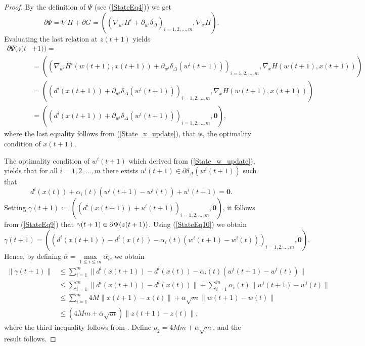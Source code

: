 \documentclass[12pt]{article}
\numberwithin{equation}{section}
\begin{document}
\begin{proof}
By the definition of $\Psi$ (see (\ref{StateEq4})) we get
\begin{equation*}
	\partial \Psi = \nabla H + \partial G  
= \left( \left( \nabla_{w^i} H^i + \partial_{w^i} \delta_{\Delta} \right)_{i=1,2, \ldots ,m} , \nabla_x H \right) .
\end{equation*}
Evaluating the last relation at $z(t+1)$ yields
\begin{align}
	\partial \Psi(z(t & + 1)) = \\
	& = \left( \left( \nabla_{w^i} H^i(w(t+1),x(t+1)) + \partial_{w^i} \delta_{\Delta}(w^i(t+1)) \right)_{i=1,2, \ldots ,m} , \nabla_x H(w(t+1),x(t+1)) \right) \\
	& = \left( \left( d^i(x(t+1)) + \partial_{w^i} \delta_{\Delta}(w^i(t+1)) \right)_{i=1,2, \ldots ,m} , \nabla_x H(w(t+1),x(t+1)) \right) \\
	& = \left( \left( d^i(x(t+1)) + \partial_{w^i} \delta_{\Delta}(w^i(t+1)) \right)_{i=1,2, \ldots ,m} , \mathbf{0} \right) , \label{StateEq9}
\end{align}
where the last equality follows from (\ref{State_x_update}), that is, the optimality condition of $x(t+1)$.

The optimality condition of $w^i(t+1)$ which derived from (\ref{State_w_update}), yields that for all $i=1, 2, \ldots ,m$ there exists $u^i(t+1) \in \partial \delta_{\Delta}(w^i(t+1))$ such that
\begin{equation}
	d^i(x(t)) + \alpha_i(t) \left( w^i(t+1) - w^i(t) \right) + u^i(t+1) = \mathbf{0} . \label{StateEq10}
\end{equation}
Setting $\gamma(t+1) := \left( \left( d^i(x(t+1)) + u^i(t+1) \right)_{i=1,2, \ldots ,m}, \mathbf{0} \right)$, it follows from (\ref{StateEq9})  that $\gamma(t+1) \in \\ \partial \Psi(z(t+1))$. Using (\ref{StateEq10}) we obtain
\begin{equation*}
	\gamma(t+1) = \left( \left( d^i(x(t+1)) - d^i(x(t)) - \alpha_i(t)(w^i(t+1) - w^i(t)) \right)_{i=1,2, \ldots, m}, \mathbf{0} \right).
\end{equation*}
Hence, by defining $\overline{\alpha} = \max\limits_{1 \leq i \leq m} \overline{\alpha_i}$, we obtain
\begin{align*}
	\| \gamma(t+1) \|
	& \leq \sum\limits_{i=1}^{m} \| d^i(x(t+1)) - d^i(x(t)) - \alpha_i(t) \left( w^i(t+1) - w^i(t) \right) \| \\
	& \leq \sum\limits_{i=1}^{m} \| d^i(x(t+1)) - d^i(x(t)) \| + \sum\limits_{i=1}^{m} \alpha_i(t) \| w^i(t+1) - w^i(t) \| \\
	& \leq \sum\limits_{i=1}^{m} 4M \| x(t+1) - x(t) \| +  \overline{\alpha} \sqrt{m}\|w(t+1) - w(t)\| \\
	& \leq \left( 4Mm + \overline{\alpha}\sqrt{m} \right) \|z(t+1) - z(t)\| , 
\end{align*}
where the third inequality follows from . Define $\rho_2 = 4Mm + \overline{\alpha}\sqrt{m}$, and the result follows.
\end{proof}
\end{document}
